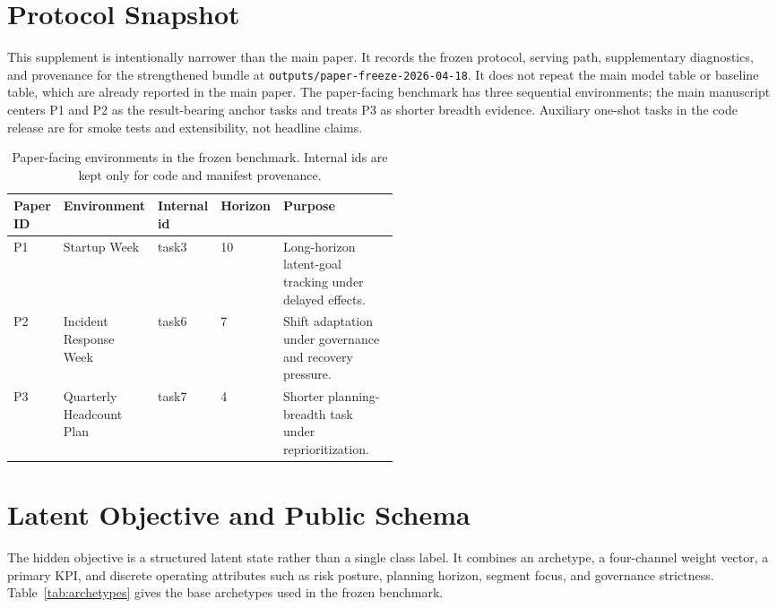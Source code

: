 \section{Protocol Snapshot}

This supplement is intentionally narrower than the main paper. It records the
frozen protocol, serving path, supplementary diagnostics, and provenance for
the strengthened bundle at \texttt{outputs/paper-freeze-2026-04-18}. It does
not repeat the main model table or baseline table, which are already reported
in the main paper. The paper-facing benchmark has three sequential
environments; the main manuscript centers P1 and P2 as the result-bearing
anchor tasks and treats P3 as shorter breadth evidence. Auxiliary one-shot
tasks in the code release are for smoke tests and extensibility, not headline
claims.

\begin{table}[!h]
  \centering
  \scriptsize
  \setlength{\tabcolsep}{4pt}
  \begin{tabular}{lllp{0.12\linewidth}p{0.38\linewidth}}
    \toprule
    Paper ID & Environment & Internal id & Horizon & Purpose \\
    \midrule
    P1 & Startup Week & task3 & 10 & Long-horizon latent-goal tracking under delayed effects. \\
    P2 & Incident Response Week & task6 & 7 & Shift adaptation under governance and recovery pressure. \\
    P3 & Quarterly Headcount Plan & task7 & 4 & Shorter planning-breadth task under reprioritization. \\
    \bottomrule
  \end{tabular}
  \caption{Paper-facing environments in the frozen benchmark. Internal ids are
  kept only for code and manifest provenance.}
  \label{tab:taskcatalog}
\end{table}

\section{Latent Objective and Public Schema}

The hidden objective is a structured latent state rather than a single class
label. It combines an archetype, a four-channel weight vector, a primary KPI,
and discrete operating attributes such as risk posture, planning horizon,
segment focus, and governance strictness. Table~\ref{tab:archetypes} gives the
base archetypes used in the frozen benchmark.


